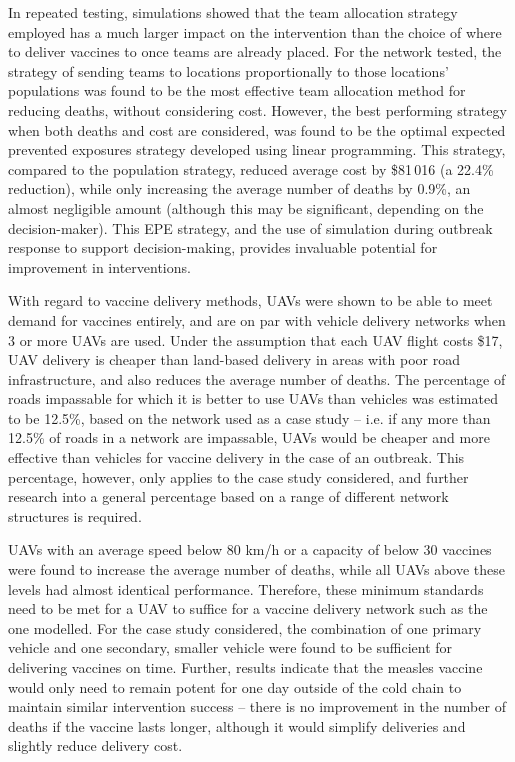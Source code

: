 In repeated testing, simulations showed that the team allocation strategy employed has a much larger impact on the intervention than the choice of where to deliver vaccines to once teams are already placed. For the network tested, the strategy of sending teams to locations proportionally to those locations' populations was found to be the most effective team allocation method for reducing deaths, without considering cost. However, the best performing strategy when both deaths and cost are considered, was found to be the optimal expected prevented exposures strategy developed using linear programming. This strategy, compared to the population strategy, reduced average cost by \$81\,016 (a 22.4\% reduction), while only increasing the average number of deaths by 0.9\%, an almost negligible amount (although this may be significant, depending on the decision-maker). This EPE strategy, and the use of simulation during outbreak response to support decision-making, provides invaluable potential for improvement in interventions.

With regard to vaccine delivery methods, UAVs were shown to be able to meet demand for vaccines entirely, and are on par with vehicle delivery networks when 3 or more UAVs are used. Under the assumption that each UAV flight costs \$17, UAV delivery is cheaper than land-based delivery in areas with poor road infrastructure, and also reduces the average number of deaths. The percentage of roads impassable for which it is better to use UAVs than vehicles was estimated to be 12.5\%, based on the network used as a case study -- i.e. if any more than 12.5\% of roads in a network are impassable, UAVs would be cheaper and more effective than vehicles for vaccine delivery in the case of an outbreak. This percentage, however, only applies to the case study considered, and further research into a general percentage based on a range of different network structures is required.

UAVs with an average speed below 80 km/h or a capacity of below 30 vaccines were found to increase the average number of deaths, while all UAVs above these levels had almost identical performance. Therefore, these minimum standards need to be met for a UAV to suffice for a vaccine delivery network such as the one modelled. 
For the case study considered, the combination of one primary vehicle and one secondary, smaller vehicle were found to be sufficient for delivering vaccines on time. Further, results indicate that the measles vaccine would only need to remain potent for one day outside of the cold chain to maintain similar intervention success -- there is no improvement in the number of deaths if the vaccine lasts longer, although it would simplify deliveries and slightly reduce delivery cost.


